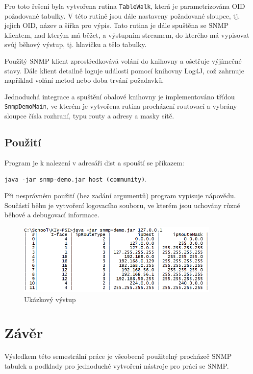 \documentclass[12pt,a4paper]{article}
\let\oldsection\section
\renewcommand\section{\clearpage\oldsection}
\begin{document}
Pro toto řešení byla vytvořena rutina \texttt{TableWalk}, která je parametrizována OID požadované tabulky.
V této rutině jsou dále nastaveny požadované sloupce, tj. jejich OID, název a šířka pro výpis.
Tato rutina je dále spuštěna se SNMP klientem, nad kterým má běžet, a výstupním streamem, do kterého má vypisovat svůj běhový výstup, tj. hlavičku a tělo tabulky.

Použitý SNMP klient zprostředkovává volání do knihovny a ošetřuje výjímečné stavy. Dále klient detailně loguje události pomocí knihovny Log4J, což zahrnuje například volání metod nebo doba trvání požadavků.

Jednoduchá integrace a spuštění obalové knihovny je implementováno třídou \texttt{SnmpDemoMain}, ve kterém je vytvořena rutina procházení routovací a vybrány sloupce čísla rozhraní, typu routy a adresy a masky sítě.

\subsection{Použití}

\noindent Program je k nalezení v adresáři dist a spouští se příkazem:

\texttt{java -jar snmp-demo.jar host (community)}.

\noindent Při nesprávném použití (bez zadání argumentů) program vypisuje nápovědu.
Součástí běhu je vytvoření logovacího souboru, ve kterém jsou uchovány různé běhové a debugovací informace.

\begin{figure}
\centering
\includegraphics[width=10cm]{img/01_cli}
\caption{Ukázkový výstup}
\label{fig:cli}
\end{figure}

\section{Závěr}
Výsledkem této semestrální práce je všeobecně použitelný procházeč SNMP tabulek a podklady pro jednoduché vytvoření nástroje pro práci se SNMP.


\end{document}
